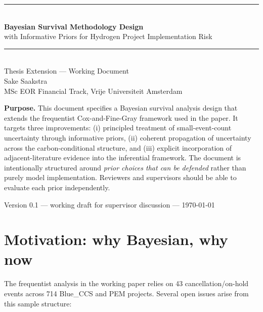 \documentclass[11pt,a4paper]{article}
\begin{document}
\begin{titlepage}
  \centering
  \vspace*{1.5cm}
  {\color{boxborder}\rule{\linewidth}{1.5pt}}\\[0.3cm]
  {\Huge\bfseries Bayesian Survival Methodology Design}\\[0.3cm]
  {\Large with Informative Priors for Hydrogen Project Implementation Risk}\\[0.3cm]
  {\color{boxborder}\rule{\linewidth}{1pt}}\\[1.5cm]

  {\large Thesis Extension --- Working Document}\\[0.3cm]
  {\normalsize Sake Saakstra}\\[0.2cm]
  {\normalsize MSc EOR Financial Track, Vrije Universiteit Amsterdam}\\[2cm]

  \begin{tcolorbox}[colback=boxbg, colframe=boxborder, boxrule=0.6pt, arc=2mm, width=0.85\textwidth]
    \textbf{Purpose.} This document specifies a Bayesian survival analysis design that extends the frequentist Cox-and-Fine-Gray framework used in the paper. It targets three improvements: (i) principled treatment of small-event-count uncertainty through informative priors, (ii) coherent propagation of uncertainty across the carbon-conditional structure, and (iii) explicit incorporation of adjacent-literature evidence into the inferential framework. The document is intentionally structured around \emph{prior choices that can be defended} rather than purely model implementation. Reviewers and supervisors should be able to evaluate each prior independently.
  \end{tcolorbox}

  \vfill
  {\normalsize Version 0.1 --- working draft for supervisor discussion --- \today}
\end{titlepage}

\tableofcontents
\newpage

\section{Motivation: why Bayesian, why now}

The frequentist analysis in the working paper relies on 43 cancellation/on-hold events across 714 Blue\_CCS and PEM projects. Several open issues arise from this sample structure:
\end{document}
